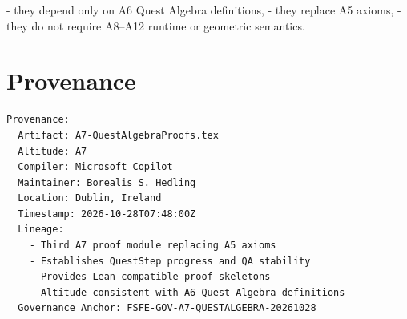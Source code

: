 \documentclass[11pt]{article}
\begin{document}
- they depend only on A6 Quest Algebra definitions,
- they replace A5 axioms,
- they do not require A8–A12 runtime or geometric semantics.

\newpage


\section*{Provenance}

\begin{verbatim}
Provenance:
  Artifact: A7-QuestAlgebraProofs.tex
  Altitude: A7
  Compiler: Microsoft Copilot
  Maintainer: Borealis S. Hedling
  Location: Dublin, Ireland
  Timestamp: 2026-10-28T07:48:00Z
  Lineage:
    - Third A7 proof module replacing A5 axioms
    - Establishes QuestStep progress and QA stability
    - Provides Lean-compatible proof skeletons
    - Altitude-consistent with A6 Quest Algebra definitions
  Governance Anchor: FSFE-GOV-A7-QUESTALGEBRA-20261028
\end{verbatim}
\end{document}
